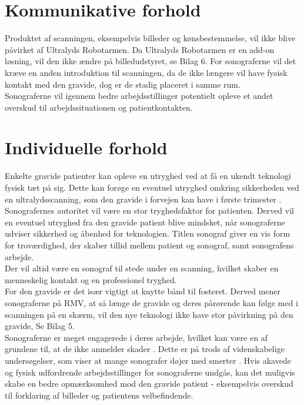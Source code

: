 \section{Kommunikative forhold}
Produktet af scanningen, eksempelvis billeder og kønsbestemmelse, vil ikke blive påvirket af Ultralyds Robotarmen. Da Ultralyds Robotarmen er en add-on løsning, vil den ikke ændre på billedudstyret, se Bilag 6. 
For sonograferne vil det kræve en anden introduktion til scanningen, da de ikke længere vil have fysisk kontakt med den gravide, dog er de stadig placeret i samme rum.  \\
Sonograferne vil igennem bedre arbejdsstillinger potentielt opleve et andet overskud til arbejdssituationen og patientkontakten.  

\section{Individuelle forhold}
Enkelte gravide patienter kan opleve en utryghed ved at få en ukendt teknologi fysisk tæt på sig. Dette kan forøge en eventuel utryghed omkring sikkerheden ved en ultralydsscanning, som den gravide i forvejen kan have i første trimester \cite{29}. \\
Sonografernes autoritet vil være en stor tryghedsfaktor for patienten. Derved vil en eventuel utryghed fra den gravide patient blive mindsket, når sonograferne udviser sikkerhed og åbenhed for teknologien. Titlen sonograf giver en vis form for troværdighed, der skaber tillid mellem patient og sonograf, samt sonografens arbejde.\\
Der vil altid være en sonograf til stede under en scanning, hvilket skaber en menneskelig kontakt og en professionel tryghed.\\
For den gravide er det især vigtigt at knytte bånd til fosteret. Derved mener sonograferne på RMV, at så længe de gravide og deres pårørende kan følge med i scanningen på en skærm, vil den nye teknologi ikke have stor påvirkning på den gravide, Se Bilag 5. \\  
Sonograferne er meget engagerede i deres arbejde, hvilket kan være en af grundene til, at de ikke anmelder skader \cite{1} \cite{24}. Dette er på trods af videnskabelige undersøgelser, som viser at mange sonografer døjer med smerter \cite{32} \cite{24} \cite{36} . 
Hvis akavede og fysisk udfordrende arbejdsstillinger for sonograferne undgås, kan det muligvis skabe en bedre opmærksomhed mod den gravide patient - eksempelvis overskud til forklaring af billeder og patientens velbefindende.  

